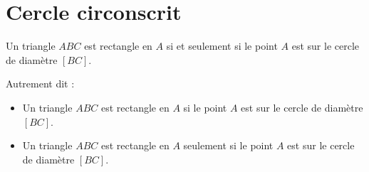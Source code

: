 





\section{Cercle circonscrit}

\begin{propriete}
    Un triangle \( ABC\) est rectangle en \( A\) si et seulement si le point \( A\) est sur le cercle de diamètre \( [BC]\).
\end{propriete}
Autrement dit :
\begin{itemize}
    \item
        Un triangle \( ABC\) est rectangle en \( A\) si le point \( A\) est sur le cercle de diamètre \( [BC]\).
    \item
        Un triangle \( ABC\) est rectangle en \( A\) seulement si le point \( A\) est sur le cercle de diamètre \( [BC]\).
\end{itemize}

\begin{center}
   
\end{center}


